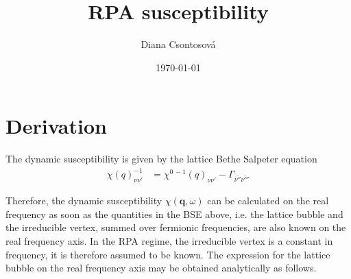 \documentclass[preprint,prb,amsmath,superscriptaddress,showpacs]{revtex4}
\newcommand{\bq}{\mathbf{q}}
\begin{document}
\title{RPA susceptibility}

\author{Diana Csontosová}

\date{\today}


\section{Derivation}


The dynamic susceptibility is given by the lattice Bethe Salpeter equation
\begin{equation*}
  \begin{split}
    \chi(q)_{\nu\nu'}^{-1} &= \chi^{0 \, -1}(q)_{\nu\nu'} - \Gamma_{\bar{\nu''}\bar{\nu'''}}
  \end{split}
\end{equation*}

Therefore, the dynamic susceptibility $\chi(\bq, \omega)$ can be calculated on the real
frequency as soon as the quantities in the BSE above, i.e. the lattice bubble and the
irreducible vertex, summed over fermionic frequencies, are also known
on the real frequency axis. In the RPA regime, the irreducible vertex
is a constant in frequency, it is therefore assumed to be known. The
expression for the lattice bubble on the real frequency axis may be
obtained analytically as follows.
\end{document}
